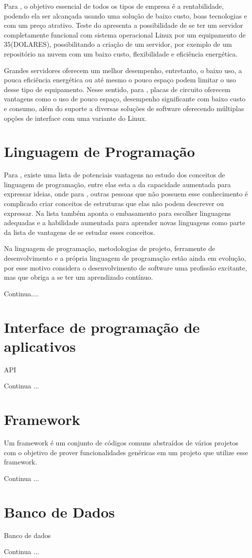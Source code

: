 Para \cite{aristotelous2016}, o objetivo essencial de todos os tipos de empresa é a rentabilidade, podendo ela ser alcançada usando uma solução de baixo custo, boas tecnologias e com um preço atrativo. Teste do \cite{aristotelous2016} apresenta a possibilidade de se ter um servidor completamente funcional com sistema operacional Linux por um equipamento de 35(DOLARES), possibilitando a criação de um servidor, por exemplo de um repositório na nuvem com um baixo custo, flexibilidade e eficiência energética. 

Grandes servidores oferecem um melhor desempenho, entretanto, o baixo uso, a pouca eficiência energética ou até mesmo o pouco espaço podem limitar o uso desse tipo de equipamento. Nesse sentido, para \cite{Cusick}, placas de circuito oferecem vantagens como o uso de pouco espaço, desempenho significante com baixo custo e consumo, além do suporte a diversas soluções de software oferecendo múltiplas opções de interface com uma variante do Linux. 

\section{Linguagem de Programação}
Para \cite{sebesta2011}, existe uma lista de potenciais vantagens no estudo dos conceitos de linguagem de programação, entre elas esta a da capacidade aumentada para expressar ideias, onde para \cite{sebesta2011}, outras pessoas que não possuem esse conhecimento é complicado criar conceitos de estruturas que elas não podem descrever ou expressar. Na lista também aponta o embasamento para escolher linguagens adequadas e a habilidade aumentada para aprender novas linguagens como parte da lista de vantagens de se estudar esses conceitos.

Na linguagem de programação, metodologias de projeto, ferramente de desenvolvimento e a própria linguagem de programação estão ainda em evolução, por esse motivo \cite{sebesta2011} considera o desenvolvimento de software uma profissão excitante, mas que obriga a se ter um aprendizado contínuo.

Continua....

\section{Interface de programação de aplicativos}
API

Continua ...

\section{Framework}
Um framework é um conjunto de códigos comuns abstraídos de vários projetos com o objetivo de prover funcionalidades genéricas em um projeto que utilize esse framework.

Continua ...
\section{Banco de Dados}
Banco de dados

 Continua ...
